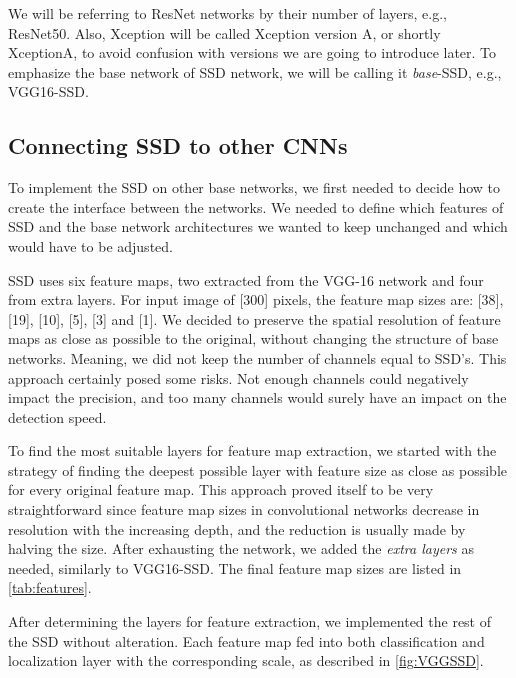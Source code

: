 We will be referring to ResNet networks by their number of layers, e.g., ResNet50. Also, Xception will be called Xception version A, or shortly XceptionA, to avoid confusion with versions we are going to introduce later. To emphasize the base network of SSD network, we will be calling it \textit{base}-SSD, e.g., VGG16-SSD.

\subsection{Connecting SSD to other CNNs}
To implement the SSD on other base networks, we first needed to decide how to create the interface between the networks. We needed to define which features of SSD and the base network architectures we wanted to keep unchanged and which would have to be adjusted.

SSD uses six feature maps, two extracted from the VGG-16 network and four from extra layers. For input image of [300] pixels, the feature map sizes are: [38], [19], [10], [5], [3] and [1]. We decided to preserve the spatial resolution of feature maps as close as possible to the original, without changing the structure of base networks. Meaning, we did not keep the number of channels equal to SSD's. This approach certainly posed some risks. Not enough channels could negatively impact the precision, and too many channels would surely have an impact on the detection speed.

To find the most suitable layers for feature map extraction, we started with the strategy of finding the deepest possible layer with feature size as close as possible for every original feature map. This approach proved itself to be very straightforward since feature map sizes in convolutional networks decrease in resolution with the increasing depth, and the reduction is usually made by halving the size. After exhausting the network, we added the \textit{extra layers} as needed, similarly to VGG16-SSD. The final feature map sizes are listed in \cref{tab:features}. 

After determining the layers for feature extraction, we implemented the rest of the SSD without alteration. Each feature map fed into both classification and localization layer with the corresponding scale, as described in \cref{fig:VGGSSD}.

